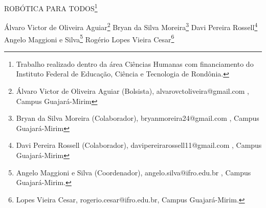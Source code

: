 \documentclass[article,12pt,onesidea,4paper,english,brazil]{abntex2}
\begin{document}
	
	
	\frenchspacing 
	
	\begin{center}
		\LARGE ROBÓTICA PARA TODOS\footnote{Trabalho realizado dentro da área Ciências Humanas com financiamento do Instituto Federal de Educação, Ciência e Tecnologia de Rondônia.}
		
		\normalsize
		Álvaro Victor de Oliveira Aguiar\footnote{Álvaro Victor de Oliveira Aguiar (Bolsista), alvarovctoliveira@gmail.com , Campus Guajará-Mirim} 
		Bryan da Silva Moreira\footnote{Bryan da Silva Moreira (Colaborador), bryanmoreira24@gmail.com , Campus Guajará-Mirim} 
		Davi Pereira Rossell\footnote{Davi Pereira Rossell (Colaborador), davipereirarossell11@gmail.com , Campus Guajará-Mirim}  \\
		Angelo Maggioni e Silva\footnote{Angelo Maggioni e Silva (Coordenador), angelo.silva@ifro.edu.br , Campus Guajará-Mirim.}
		Rogério Lopes Vieira Cesar\footnote{Lopes Vieira Cesar, rogerio.cesar@ifro.edu.br, Campus Guajará-Mirim.} 
	\end{center}
	
\end{document}
